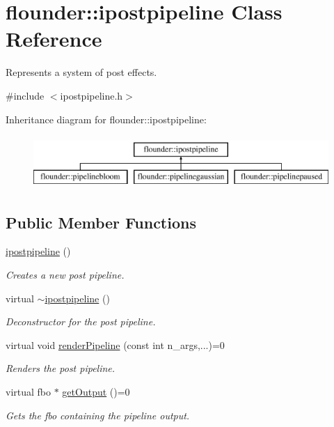 \hypertarget{classflounder_1_1ipostpipeline}{}\section{flounder\+:\+:ipostpipeline Class Reference}
\label{classflounder_1_1ipostpipeline}


Represents a system of post effects.  




{\ttfamily \#include $<$ipostpipeline.\+h$>$}

Inheritance diagram for flounder\+:\+:ipostpipeline\+:\begin{figure}[H]
\begin{center}
\leavevmode
\includegraphics[height=2.000000cm]{classflounder_1_1ipostpipeline}
\end{center}
\end{figure}
\subsection*{Public Member Functions}
\begin{DoxyCompactItemize}
\item 
\hyperlink{classflounder_1_1ipostpipeline_a778c68518cfcdf1de4052264538b28d3}{ipostpipeline} ()
\begin{DoxyCompactList}\small\item\em Creates a new post pipeline. \end{DoxyCompactList}\item 
virtual \hyperlink{classflounder_1_1ipostpipeline_a5d8e916ae2d5a3153449a61caa4399f6}{$\sim$ipostpipeline} ()
\begin{DoxyCompactList}\small\item\em Deconstructor for the post pipeline. \end{DoxyCompactList}\item 
virtual void \hyperlink{classflounder_1_1ipostpipeline_a975b354967fa358076d02380feb55265}{render\+Pipeline} (const int n\+\_\+args,...)=0
\begin{DoxyCompactList}\small\item\em Renders the post pipeline. \end{DoxyCompactList}\item 
virtual fbo $\ast$ \hyperlink{classflounder_1_1ipostpipeline_a08f5d19b9652528337b73c2f4e0e4258}{get\+Output} ()=0
\begin{DoxyCompactList}\small\item\em Gets the fbo containing the pipeline output. \end{DoxyCompactList}\end{DoxyCompactItemize}


